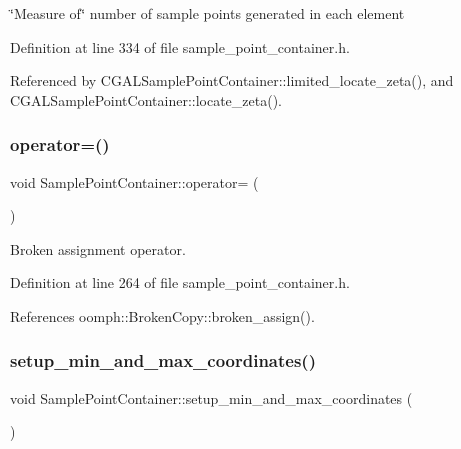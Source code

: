 \char`\"{}\+Measure of\char`\"{} number of sample points generated in each element 



Definition at line 334 of file sample\+\_\+point\+\_\+container.\+h.



Referenced by C\+G\+A\+L\+Sample\+Point\+Container\+::limited\+\_\+locate\+\_\+zeta(), and C\+G\+A\+L\+Sample\+Point\+Container\+::locate\+\_\+zeta().

\mbox{\label{classSamplePointContainer_a9b614945308f23a6852f9a38b8a85957}} 
\subsubsection{\texorpdfstring{operator=()}{operator=()}}
{\footnotesize\ttfamily void Sample\+Point\+Container\+::operator= (\begin{DoxyParamCaption}\item[{const \hyperlink{classSamplePointContainer}{Sample\+Point\+Container} \&}]{ }\end{DoxyParamCaption})\hspace{0.3cm}{\ttfamily [inline]}}



Broken assignment operator. 



Definition at line 264 of file sample\+\_\+point\+\_\+container.\+h.



References oomph\+::\+Broken\+Copy\+::broken\+\_\+assign().

\mbox{\label{classSamplePointContainer_af69785a39545f46473ccf0d10f61e08b}} 
\subsubsection{\texorpdfstring{setup\+\_\+min\+\_\+and\+\_\+max\+\_\+coordinates()}{setup\_min\_and\_max\_coordinates()}}
{\footnotesize\ttfamily void Sample\+Point\+Container\+::setup\+\_\+min\+\_\+and\+\_\+max\+\_\+coordinates (\begin{DoxyParamCaption}{ }\end{DoxyParamCaption})\hspace{0.3cm}{\ttfamily [protected]}}



